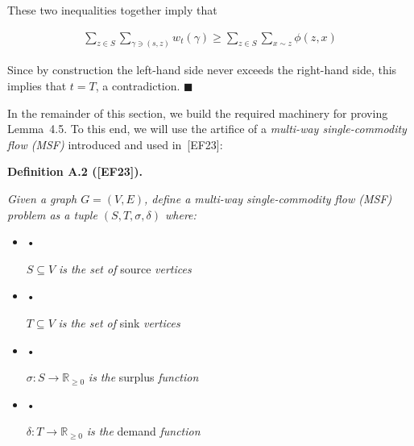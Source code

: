 These two inequalities together imply that\par


\[\begin{gathered}
\sum_{z\in S}\sum_{\gamma\ni(s,z)}w_{t}(\gamma)\geq\sum_{z\in S}\sum_{x\sim z}\phi(z,x)
\end{gathered}\]


Since by construction the left-hand side never exceeds the right-hand side, this
implies that $t=T$, a contradiction.
\ensuremath{\blacksquare}\par





In the remainder of this section, we build the required machinery for proving Lemma 4.5.
To this end, we will use the artifice of a \emph{multi-way single-commodity flow (MSF)} introduced and used in [EF23]:\par





\par\medskip\noindent\textbf{\textbf{Definition A.2}\textbf{ }([EF23])\textbf{.}}\par



\emph{Given a graph $G=(V,E)$, define a multi-way single-commodity flow (MSF) problem as a tuple
$(S,T,\sigma,\delta)$
where:}\par


\begin{itemize}


\item[] • 


$S\subseteq V$\emph{ is the set of }source\emph{ vertices}\par




\item[] • 


$T\subseteq V$\emph{ is the set of }sink\emph{ vertices}\par




\item[] • 


$\sigma:S\rightarrow\mathbb{R}_{\geq 0}$\emph{ is the }surplus\emph{ function}\par




\item[] • 


$\delta:T\rightarrow\mathbb{R}_{\geq 0}$\emph{ is the }demand\emph{ function}\par




\end{itemize}


